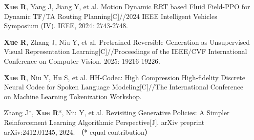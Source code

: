 \begin{achievelist}
    \item \textbf{Xue R}, Yang J, Jiang Y, et al. Motion Dynamic RRT based Fluid Field-PPO for Dynamic TF/TA Routing Planning[C]//2024 IEEE Intelligent Vehicles Symposium (IV). IEEE, 2024: 2743-2748.
    \item \textbf{Xue R}, Zhang J, Niu Y, et al. Pretrained Reversible Generation as Unsupervised Visual Representation Learning[C]//Proceedings of the IEEE/CVF International Conference on Computer Vision. 2025: 19216-19226.
    \item \textbf{Xue R}, Niu Y, Hu S, et al. HH-Codec: High Compression High-fidelity Discrete Neural Codec for Spoken Language Modeling[C]//The International Conference on Machine Learning Tokenization Workshop.
    \item Zhang J*, \textbf{Xue R}*, Niu Y, et al. Revisiting Generative Policies: A Simpler Reinforcement Learning Algorithmic Perspective[J]. arXiv preprint arXiv:2412.01245, 2024. （* equal contribution）
    \item 
    
\end{achievelist}

